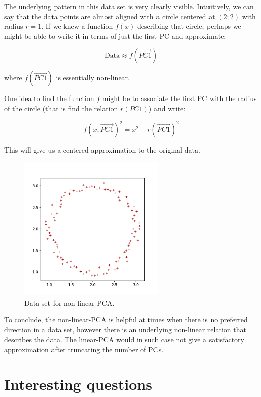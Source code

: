\documentclass[10pt,twocolumn]{article}
\begin{document}
The underlying pattern in this data set is very clearly visible. Intuitively, we can say that the data points are almost aligned with a circle centered at $(2;2)$ with radius $r=1$. If we knew a function $f(x)$ describing that circle, perhaps we might be able to write it in terms of just the first PC and approximate:

\begin{equation}
\text{Data} \approx f(\vec{PC1})
\end{equation}

where $f(\vec{PC1})$ is essentially non-linear.

One idea to find the function $f$ might be to associate the first PC with the radius of the circle (that is find the relation $r(PC1)$) and write:

\begin{equation}
f(x, \vec{PC1})^2 = x^2 + r(\vec{PC1})^2
\end{equation}

This will give us a centered approximation to the original data. 

\begin{figure}[H]
\centering\includegraphics[width=7cm]{../python/PCA-fake-datasets/PCA_nonlinear_scatter_2.png}
\caption{Data set for non-linear-PCA.}			
\label{fig:nonlinear_PCA_data}
\end{figure}

To conclude, the non-linear-PCA is helpful at times when there is no preferred direction in a data set, however there is an underlying non-linear relation that describes the data. The linear-PCA would in such case not give a satisfactory approximation after truncating the number of PCs. 


\section{Interesting questions}
\end{document}
